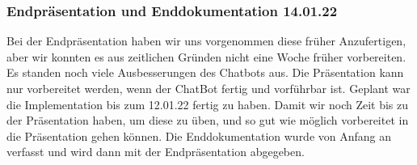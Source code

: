 \subsubsection{Endpräsentation und Enddokumentation 14.01.22}
Bei der Endpräsentation haben wir uns vorgenommen diese früher Anzufertigen, aber wir konnten es aus zeitlichen Gründen nicht eine Woche früher vorbereiten.
Es standen noch viele Ausbesserungen des Chatbots aus. 
Die Präsentation kann nur vorbereitet werden, wenn der ChatBot fertig und vorführbar ist. 
Geplant war die Implementation bis zum 12.01.22 fertig zu haben. 
Damit wir noch Zeit bis zu der Präsentation haben, um diese zu üben,
und so gut wie möglich vorbereitet in die Präsentation gehen können.
Die Enddokumentation wurde von Anfang an verfasst und wird dann mit der Endpräsentation abgegeben.